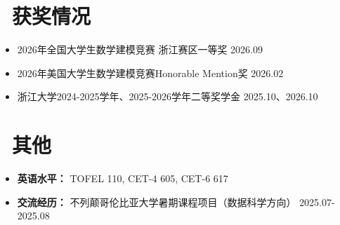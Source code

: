 \documentclass[11pt]{article}
\begin{document}
\section{\makebox[\widthof{\faGraduationCap}][c]{\color{CVBlue}\faList}\ 获奖情况}
\begin{itemize}
    \item 2026年全国大学生数学建模竞赛 浙江赛区一等奖 \hfill 2026.09
    \item 2026年美国大学生数学建模竞赛Honorable Mention奖 \hfill 2026.02
    \item 浙江大学2024-2025学年、2025-2026学年二等奖学金 \hfill 2025.10、2026.10
\end{itemize}
    
\section{\makebox[\widthof{\faInfo}][c]{\color{CVBlue}\faInfo}\ 其他}
\begin{itemize}[parsep=0.5ex]
    \item \textbf{英语水平：} TOFEL 110, CET-4 605, CET-6 617
    \item \textbf{交流经历：} 不列颠哥伦比亚大学暑期课程项目（数据科学方向） \hfill 2025.07-2025.08
\end{itemize}
\end{document}
